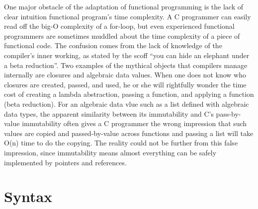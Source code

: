 \documentclass[preprint]{sigplanconf}
\begin{document}
One major obstacle of the adaptation of functional programming is the lack of clear intuition functional program's time complexity. A C programmer can easily read off the big-O complexity of a for-loop, but even experienced functional programmers are sometimes muddled about the time complexity of a piece of functional code. The confusion comes from the lack of knowledge of the compiler's inner working, as stated by the scoff ``you can hide an elephant under a beta reduction''. Two examples of the mythical objects that compilers manage internally are closures and algebraic data values. When one does not know who closures are created, passed, and used, he or she will rightfully wonder the time cost of creating a lambda abstraction, passing a function, and applying a function (beta reduction). For an algebraic data vlue such as a list defined with algebraic data types, the apparent similarity between its immutability and C's pass-by-value immutability often gives a C programmer the wrong impression that such values are copied and passed-by-value across functions and passing a list will take O(n) time to do the copying. The reality could not be further from this false impression, since immutability means almost everything can be safely implemented by pointers and references.

\appendix

\section{Syntax}
\end{document}
